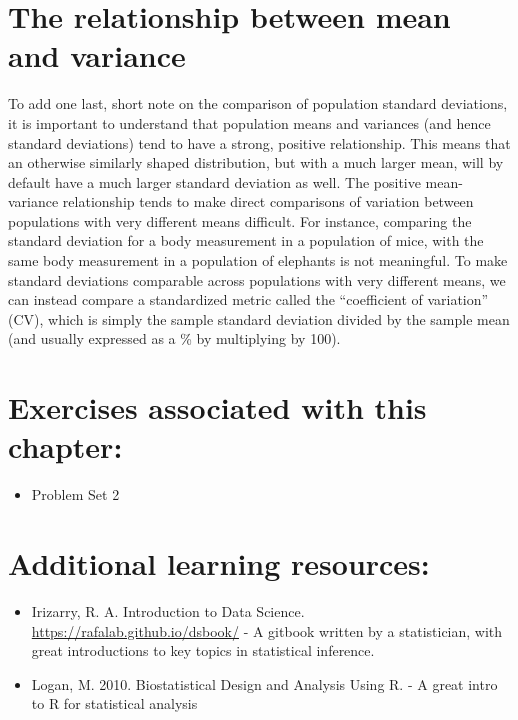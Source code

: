 \documentclass[]{book}
\providecommand{\tightlist}{%
  \setlength{\itemsep}{0pt}\setlength{\parskip}{0pt}}
\begin{document}
\hypertarget{the-relationship-between-mean-and-variance}{%
\section{The relationship between mean and variance}\label{the-relationship-between-mean-and-variance}}

To add one last, short note on the comparison of population standard deviations, it is important to understand that population means and variances (and hence standard deviations) tend to have a strong, positive relationship. This means that an otherwise similarly shaped distribution, but with a much larger mean, will by default have a much larger standard deviation as well. The positive mean-variance relationship tends to make direct comparisons of variation between populations with very different means difficult. For instance, comparing the standard deviation for a body measurement in a population of mice, with the same body measurement in a population of elephants is not meaningful. To make standard deviations comparable across populations with very different means, we can instead compare a standardized metric called the ``coefficient of variation'' (CV), which is simply the sample standard deviation divided by the sample mean (and usually expressed as a \% by multiplying by 100).

\hypertarget{exercises-associated-with-this-chapter-4}{%
\section{Exercises associated with this chapter:}\label{exercises-associated-with-this-chapter-4}}

\begin{itemize}
\tightlist
\item
  Problem Set 2
\end{itemize}

\hypertarget{additional-learning-resources-4}{%
\section{Additional learning resources:}\label{additional-learning-resources-4}}

\begin{itemize}
\item
  Irizarry, R. A. Introduction to Data Science. \url{https://rafalab.github.io/dsbook/} - A gitbook written by a statistician, with great introductions to key topics in statistical inference.
\item
  Logan, M. 2010. Biostatistical Design and Analysis Using R. - A great intro to R for statistical analysis
\end{itemize}
\end{document}
